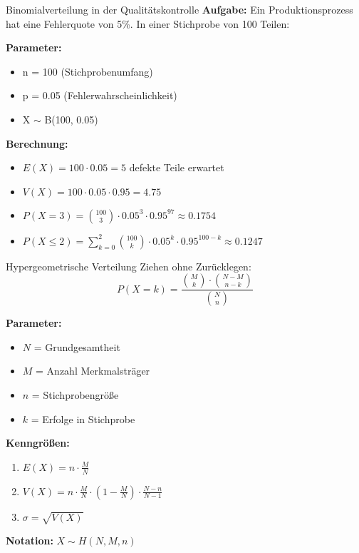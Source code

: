 \begin{example}{Binomialverteilung in der Qualitätskontrolle}
\textbf{Aufgabe:} Ein Produktionsprozess hat eine Fehlerquote von 5\%. In einer Stichprobe von 100 Teilen:

\textbf{Parameter:}
\begin{itemize}
\item n = 100 (Stichprobenumfang)
\item p = 0.05 (Fehlerwahrscheinlichkeit)
\item X $\sim$  B(100, 0.05)
\end{itemize}

\textbf{Berechnung:}
\begin{itemize}
\item $E(X) = 100 \cdot 0.05 = 5$ defekte Teile erwartet
\item $V(X) = 100 \cdot 0.05 \cdot 0.95 = 4.75$
\item $P(X=3) = \binom{100}{3} \cdot 0.05^3 \cdot 0.95^{97} \approx 0.1754$
\item $P(X \leq 2) = \sum_{k=0}^2 \binom{100}{k} \cdot 0.05^k \cdot 0.95^{100-k} \approx 0.1247$
\end{itemize}
\end{example}

\begin{definition}{Hypergeometrische Verteilung}
Ziehen ohne Zurücklegen:
$$P(X=k)=\frac{\binom{M}{k} \cdot \binom{N-M}{n-k}}{\binom{N}{n}}$$

\textbf{Parameter:}
\begin{itemize}
    \item $N$ = Grundgesamtheit
    \item $M$ = Anzahl Merkmalsträger
    \item $n$ = Stichprobengröße
    \item $k$ = Erfolge in Stichprobe
\end{itemize}

\textbf{Kenngrößen:}
\begin{enumerate}
    \item $E(X) = n \cdot \frac{M}{N}$
    \item $V(X) = n \cdot \frac{M}{N} \cdot (1-\frac{M}{N}) \cdot \frac{N-n}{N-1}$
    \item $\sigma = \sqrt{V(X)}$
\end{enumerate}

\textbf{Notation:} $X \sim H(N,M,n)$
\end{definition}

